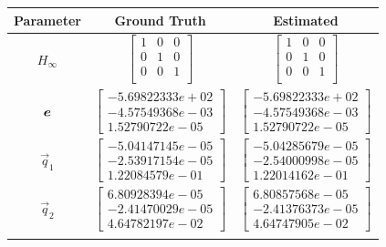 \begin{table}[htbp]
	\centering
	\scriptsize  
	\begin{tabular}{ccc}
		\toprule
		\bfseries Parameter & \bfseries Ground Truth &\bfseries Estimated \\ \midrule
		$H_\infty$   &  $\begin{bmatrix}1 &0&0 \\
		0&1& 0\\
		0& 0&1\\ \end{bmatrix}$ &$\begin{bmatrix}1 &0&0 \\
		0&1& 0\\
		0& 0&1\\ \end{bmatrix}$  \\
		\addlinespace[5pt]
		$\boldsymbol{e}$ & $\begin{bmatrix} -5.69822333e+02 \\
		-4.57549368e-03\\
		1.52790722e-05 \end{bmatrix}$&$\begin{bmatrix} -5.69822333e+02 \\
		-4.57549368e-03\\
		1.52790722e-05 \end{bmatrix}$ \\
		\addlinespace[5pt]
		$\vec{q}_1$ & $\begin{bmatrix} -5.04147145e-05 \\
		-2.53917154e-05\\
		1.22084579e-01 \end{bmatrix}$ & $\begin{bmatrix} -5.04285679e-05 \\
		-2.54000998e-05\\
		1.22014162e-01 \end{bmatrix} $ \\
		\addlinespace[5pt]
		$\vec{q}_2$ & $\begin{bmatrix} 6.80928394e-05\\
		-2.41470029e-05 \\
		4.64782197e-02 \end{bmatrix} $ & $\begin{bmatrix} 6.80857568e-05\\
		-2.41376373e-05 \\
		4.64747905e-02 \end{bmatrix}$ \\
		\addlinespace[5pt]

\end{tabular}
\end{table}
